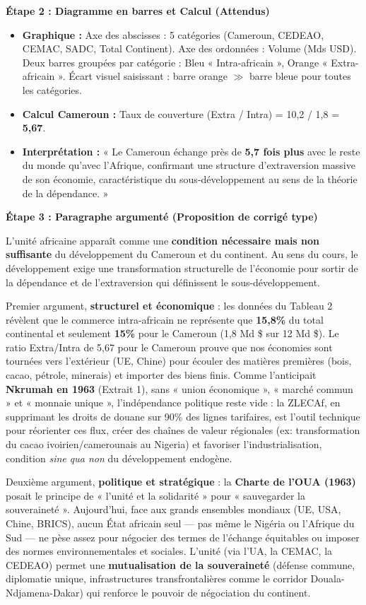 \documentclass[11pt]{article}
\newcommand{\cle}[1]{{\popxbold\color{popdark}#1}}
\begin{document}
\begin{exoresolu}
\textbf{Étape 2 : Diagramme en barres et Calcul (Attendus)}
\begin{itemize}
    \item \textbf{Graphique :} Axe des abscisses : 5 catégories (Cameroun, CEDEAO, CEMAC, SADC, Total Continent). Axe des ordonnées : Volume (Mds USD). Deux barres groupées par catégorie : Bleu « Intra-africain », Orange « Extra-africain ». Écart visuel saisissant : barre orange $\gg$ barre bleue pour toutes les catégories.
    \item \textbf{Calcul Cameroun :} Taux de couverture (Extra / Intra) = 10,2 / 1,8 = \textbf{5,67}.
    \item \textbf{Interprétation :} « Le Cameroun échange près de \textbf{5,7 fois plus} avec le reste du monde qu'avec l'Afrique, confirmant une structure d'\cle{extraversion} massive de son économie, caractéristique du \cle{sous-développement} au sens de la théorie de la dépendance. »
\end{itemize}

\textbf{Étape 3 : Paragraphe argumenté (Proposition de corrigé type)}

L'unité africaine apparaît comme une \textbf{condition nécessaire mais non suffisante} du développement du Cameroun et du continent. Au sens du cours, le \cle{développement} exige une transformation structurelle de l'économie pour sortir de la \cle{dépendance} et de l'\cle{extraversion} qui définissent le \cle{sous-développement}. 

Premier argument, \textbf{structurel et économique} : les données du Tableau 2 révèlent que le commerce intra-africain ne représente que \textbf{15,8\%} du total continental et seulement \textbf{15\%} pour le Cameroun (1,8 Md \$ sur 12 Md \$). Le ratio Extra/Intra de 5,67 pour le Cameroun prouve que nos économies sont tournées vers l'extérieur (UE, Chine) pour écouler des matières premières (bois, cacao, pétrole, minerais) et importer des biens finis. Comme l'anticipait \textbf{Nkrumah en 1963} (Extrait 1), sans « union économique », « marché commun » et « monnaie unique », l'indépendance politique reste vide : la ZLECAf, en supprimant les droits de douane sur 90\% des lignes tarifaires, est l'outil technique pour réorienter ces flux, créer des chaînes de valeur régionales (ex: transformation du cacao ivoirien/camerounais au Nigeria) et favoriser l'industrialisation, condition \emph{sine qua non} du développement endogène.

Deuxième argument, \textbf{politique et stratégique} : la \textbf{Charte de l'OUA (1963)} posait le principe de « l'unité et la solidarité » pour « sauvegarder la souveraineté ». Aujourd'hui, face aux grands ensembles mondiaux (UE, USA, Chine, BRICS), aucun État africain seul — pas même le Nigéria ou l'Afrique du Sud — ne pèse assez pour négocier des termes de l'échange équitables ou imposer des normes environnementales et sociales. L'unité (via l'UA, la CEMAC, la CEDEAO) permet une \textbf{mutualisation de la souveraineté} (défense commune, diplomatie unique, infrastructures transfrontalières comme le corridor Douala-Ndjamena-Dakar) qui renforce le pouvoir de négociation du continent.


\end{exoresolu}
\end{document}
